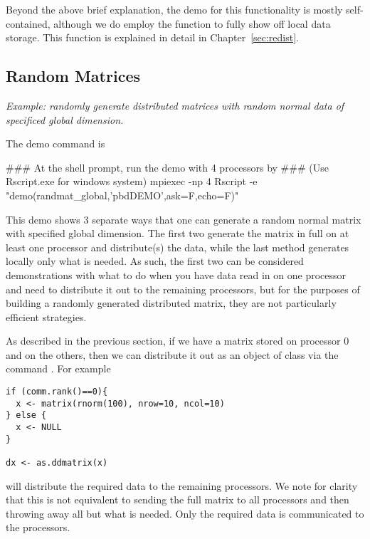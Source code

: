 Beyond the above brief explanation, the demo for this functionality is mostly 
self-contained, although we do employ the  function to 
fully show off local data storage.  This function is explained in detail in 
Chapter~\ref{sec:redist}.






\subsection{Random Matrices}\label{subsec:rng.gl}

\emph{Example:  randomly generate distributed matrices with random normal data 
of specificed global dimension.}

The demo command is
\begin{Command}
### At the shell prompt, run the demo with 4 processors by
### (Use Rscript.exe for windows system)
mpiexec -np 4 Rscript -e "demo(randmat_global,'pbdDEMO',ask=F,echo=F)"
\end{Command}

This demo shows 3 separate ways that one can generate a random normal matrix 
with specified global dimension.  The first two generate the matrix in full on 
at least one processor and distribute(s) the data, while the last method 
generates locally only what is needed.  As such, the first two can be considered 
demonstrations with what to do when you have data read in on one processor and 
need to distribute it out to the remaining processors, but for the purposes of 
building a randomly generated distributed matrix, they are not particularly 
efficient strategies.

As described in the previous section, if we have a matrix  stored on 
processor 0 and  on the others, then we can distribute it out as an 
object of
class  via the command
.  For example
\begin{lstlisting}[language=rr]
if (comm.rank()==0){
  x <- matrix(rnorm(100), nrow=10, ncol=10)
} else {
  x <- NULL
}

dx <- as.ddmatrix(x)
\end{lstlisting}

will distribute the required data to the remaining processors.  We note for 
clarity that this is not equivalent to sending the full matrix to all processors 
and then throwing away all but what is needed.  Only the required data is 
communicated to the processors.

